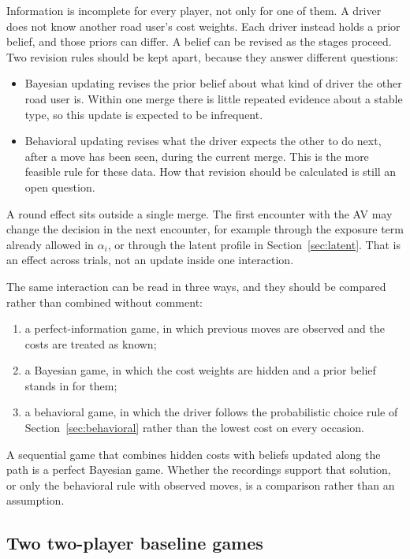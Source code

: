 \documentclass[11pt,a4paper]{article}
\begin{document}
Information is incomplete for every player, not only for one of them. A driver does not know another road user's cost weights. Each driver instead holds a prior belief, and those priors can differ. A belief can be revised as the stages proceed. Two revision rules should be kept apart, because they answer different questions:

\begin{itemize}[noitemsep]
  \item Bayesian updating revises the prior belief about what kind of driver the other road user is. Within one merge there is little repeated evidence about a stable type, so this update is expected to be infrequent.
  \item Behavioral updating revises what the driver expects the other to do next, after a move has been seen, during the current merge. This is the more feasible rule for these data. How that revision should be calculated is still an open question.
\end{itemize}

A round effect sits outside a single merge. The first encounter with the AV may change the decision in the next encounter, for example through the exposure term already allowed in $\alpha_i$, or through the latent profile in Section~\ref{sec:latent}. That is an effect across trials, not an update inside one interaction.

The same interaction can be read in three ways, and they should be compared rather than combined without comment:

\begin{enumerate}[noitemsep]
  \item a perfect-information game, in which previous moves are observed and the costs are treated as known;
  \item a Bayesian game, in which the cost weights are hidden and a prior belief stands in for them;
  \item a behavioral game, in which the driver follows the probabilistic choice rule of Section~\ref{sec:behavioral} rather than the lowest cost on every occasion.
\end{enumerate}

A sequential game that combines hidden costs with beliefs updated along the path is a perfect Bayesian game. Whether the recordings support that solution, or only the behavioral rule with observed moves, is a comparison rather than an assumption.

\subsection{Two two-player baseline games}
\end{document}
